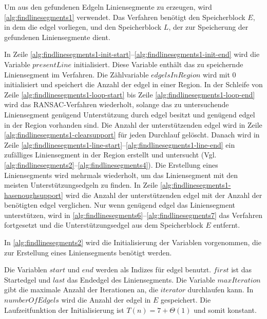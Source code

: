 Um aus den gefundenen Edgeln Liniensegmente zu erzeugen, wird \autoref{alg:findlinesegments1} verwendet. Das
 Verfahren benötigt den Speicherblock $E$, in dem die \gls{edgel} vorliegen, und den Speicherblock $L$, der zur
 Speicherung der gefundenen Liniensegmente dient.

In Zeile \ref{alg:findlinesegments1-init-start}--\ref{alg:findlinesegments1-init-end} wird die Variable
 $\mathit{presentLine}$ initialisiert. Diese Variable enthält das zu speichernde Liniensegment im Verfahren.
 Die Zählvariable $\mathit{edgelsInRegion}$ wird mit $0$ initialisiert und speichert die Anzahl der \gls{edgel} in
 einer Region. In der Schleife von Zeile \ref{alg:findlinesegments1-loop-start} bis Zeile
 \ref{alg:findlinesegments1-loop-end} wird das RANSAC-Verfahren wiederholt, solange das zu untersuchende Liniensegment
 genügend Unterstützung durch \gls{edgel} besitzt und genügend \gls{edgel} in der Region vorhanden sind. Die Anzahl der
 unterstützenden \gls{edgel} wird in Zeile \ref{alg:findlinesegments1-clearsupport} für jeden Durchlauf gelöscht.
 Danach wird in Zeile \ref{alg:findlinesegments1-line-start}--\ref{alg:findlinesegments1-line-end} ein zufälliges
 Liniensegment in der Region erstellt und untersucht
 (Vgl. \autoref{alg:findlinesegments2}--\autoref{alg:findlinesegments4}). Die Erstellung eines Liniensegments wird
 mehrmals wiederholt, um das Liniensegment mit den meisten Unterstützungsedgeln zu finden. In Zeile
 \ref{alg:findlinesegments1-hasenoughsupport} wird die Anzahl der unterstützenden \gls{edgel} mit der Anzahl der
 benötigten \gls{edgel} verglichen. Nur wenn genügend \gls{edgel} das Liniensegment unterstützen, wird in
 \autoref{alg:findlinesegments6}--\autoref{alg:findlinesegments7} das Verfahren fortgesetzt und die
 Unterstützungsedgel aus dem Speicherblock $E$ entfernt.

In \autoref{alg:findlinesegments2} wird die Initialisierung der Variablen vorgenommen, die zur Erstellung eines
 Liniensegments benötigt werden.

Die Variablen $\mathit{start}$ und $\mathit{end}$ werden als Indizes für \gls{edgel} benutzt. $\mathit{first}$ ist das
 Startedgel und $\mathit{last}$ das Endedgel des Liniensegments. Die Variable $\mathit{maxIteration}$ gibt die maximale
 Anzahl der Iterationen an, die $\mathit{iterator}$ durchlaufen kann. In $\mathit{numberOfEdgels}$ wird die Anzahl der
 \gls{edgel} in $E$ gespeichert. Die Laufzeitfunktion der Initialisierung ist $T(n) = 7 + \Theta(1)$ und somit
  konstant.

